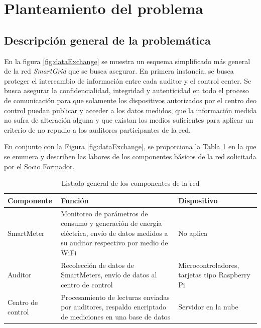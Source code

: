 \documentclass{article}
\begin{document}
    \section{Planteamiento del problema}

        \subsection{Descripción general de la problemática}

            En la figura \ref{fig:dataExchange} se muestra un esquema simplificado más general de la red \textit{SmartGrid} que se busca asegurar. En primera instancia, se busca proteger el intercambio de información entre cada auditor y el control center. Se busca asegurar la confidencialidad, integridad y autenticidad en todo el proceso de comunicación para que solamente los dispositivos autorizados por el centro deo control puedan publicar y acceder a los datos medidos, que la información medida no sufra de alteración alguna y que existan los medios suficientes para aplicar un criterio de no repudio a los auditores participantes de la red.

            En conjunto con la Figura \ref{fig:dataExchange}, se proporciona la Tabla \ref{tab:component_basic} en la que se enumera y describen las labores de los componentes básicos de la red solicitada por el Socio Formador.
            \begin{table}[htbp]
                \centering
                \begin{tabularx}{\textwidth}{ |l|X|X| }
                    \hline
                    Componente & Función & Dispositivo \\
                    \hline
                    SmartMeter	& Monitoreo de parámetros de consumo y generación de energía eléctrica, envío de datos medidos a su auditor respectivo por medio de WiFi & No aplica \\
                    \hline
                    Auditor	& Recolección de datos de SmartMeters, envío de datos al centro de control & Microcontroladores, tarjetas tipo Raspberry Pi \\
                    \hline
                    Centro de control & Procesamiento de lecturas enviadas por auditores, respaldo encriptado de mediciones en una base de datos & Servidor en la nube \\
                    \hline
                \end{tabularx}
                \label{tab:component_basic}
                \caption{Listado general de los componentes de la red}
            \end{table}
\end{document}
